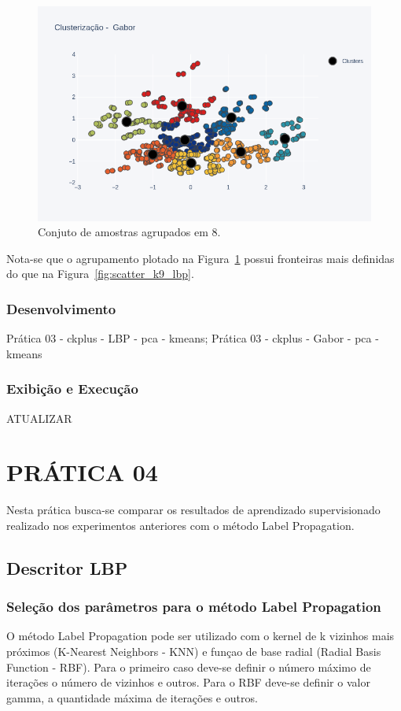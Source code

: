 \documentclass[a4paper, 12 pt, conference]{ieeeconf}  %
\begin{document}
\begin{figure}[!htbp]
	\centering
	\includegraphics[width=1.0\linewidth,clip=true,trim=0cm 0cm 0cm 0cm, keepaspectratio=true]{scatter_k8_gabor.png}
	\caption{Conjuto de amostras agrupados em 8.}
	\label{fig:scatter_k8_gabor}
\end{figure}

Nota-se que o agrupamento plotado na Figura~\ref{fig:scatter_k8_gabor} possui fronteiras mais definidas do que na Figura~\ref{fig:scatter_k9_lbp}.

\subsubsection{Desenvolvimento} Prática 03 - ckplus - LBP - pca - kmeans; Prática 03 - ckplus - Gabor - pca - kmeans
\subsubsection{Exibição e Execução} ATUALIZAR

\section{PRÁTICA 04}
\label{pratica04}
Nesta prática busca-se comparar os resultados de aprendizado supervisionado realizado nos experimentos anteriores com o método Label Propagation.

\subsection{Descritor LBP}
\subsubsection{Seleção dos parâmetros para o método Label Propagation}
O método Label Propagation pode ser utilizado com o kernel de k vizinhos mais próximos (K-Nearest Neighbors - KNN) e funçao de base radial (Radial Basis Function - RBF). Para o  primeiro caso deve-se definir o número máximo de iterações o número de vizinhos e outros. Para o RBF deve-se definir o valor gamma, a quantidade máxima de iterações e outros.
\end{document}
